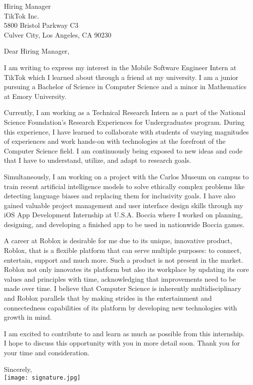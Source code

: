 \documentclass[letterpaper,12pt]{letter}
\date{}
\begin{document}
\begin{letter}{%
    Hiring Manager \\ 
	TikTok Inc. \\
	5800 Bristol Parkway C3 \\
    Culver City, Los Angeles, CA 90230
}

\opening{Dear Hiring Manager,}

I am writing to express my interest in the Mobile Software Engineer Intern at TikTok
which I learned about through a friend at my university. I am a junior pursuing 
a Bachelor of Science in Computer Science and a minor in Mathematics at Emory University.

Currently, I am working as a Technical Research Intern as a part of the National Science Foundation's 
Research Experiences for Undergraduates program. During this experience, I have learned to 
collaborate with students of varying magnitudes of experiences and work hands-on with technologies at 
the forefront of the Computer Science field. I am continuously being exposed to new ideas 
and code that I have to understand, utilize, and adapt to research goals. 

Simultaneously, I am working on a project with the Carlos Museum on campus to train recent 
artificial intelligence models to solve ethically complex problems like detecting language biases and 
replacing them for inclusivity goals. I have also gained valuable project management 
and user interface design skills through my iOS App Development Internship at U.S.A. Boccia 
where I worked on planning, designing, and developing a finished app to be used in nationwide Boccia games. 

A career at Roblox is desirable for me due to its unique, innovative product, Roblox, that is a flexible 
platform that can serve multiple purposes: to connect, entertain, support and much more. 
Such a product is not present in the market. Roblox not only innovates its platform but also its workplace
by updating its core values and principles with time, acknowledging that improvements need to be made
over time. I believe that Computer Science is inherently multidisciplinary and Roblox parallels that 
by making strides in the entertainment and connectedness capabilities of its platform by developing new 
technologies with growth in mind.

I am excited to contribute to and learn as much as possible from this internship. I hope to discuss
this opportunity with you in more detail soon. Thank you for your time and consideration.\\

\closing{Sincerely, \\
\vspace{10pt}
\texttt{[image: signature.jpg]}}


\end{letter}

\end{document}
